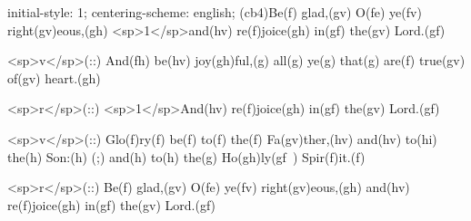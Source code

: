 initial-style: 1;
centering-scheme: english;
(cb4)Be(f) glad,(gv) O(fe) ye(fv) right(gv)eous,(gh) <sp>1</sp>and(hv) re(f)joice(gh) in(gf) the(gv) Lord.(gf)

<sp>v</sp>(::) And(fh) be(hv) joy(gh)ful,(g) all(g) ye(g) that(g) are(f) true(gv) of(gv) heart.(gh)

<sp>r</sp>(::) <sp>1</sp>And(hv) re(f)joice(gh) in(gf) the(gv) Lord.(gf)

<sp>v</sp>(::) Glo(f)ry(f) be(f) to(f) the(f) Fa(gv)ther,(hv) and(hv) to(hi) the(h) Son:(h) (;) and(h) to(h) the(g) Ho(gh)ly(gf~) Spir(f)it.(f)

<sp>r</sp>(::) Be(f) glad,(gv) O(fe) ye(fv) right(gv)eous,(gh) and(hv) re(f)joice(gh) in(gf) the(gv) Lord.(gf)